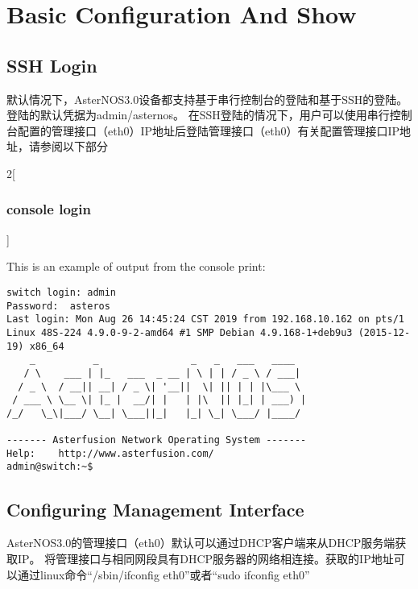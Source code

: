 
\chapter{Basic Configuration And Show}
	\section{SSH Login}
	默认情况下，AsterNOS3.0设备都支持基于串行控制台的登陆和基于SSH的登陆。登陆的默认凭据为admin/asternos。
	在SSH登陆的情况下，用户可以使用串行控制台配置的管理接口（eth0）IP地址后登陆管理接口（eth0）有关配置管理接口IP地址，请参阅以下部分
	
	\begin{paracol}{2}[\subsection*{console login}]
		\begin{rightcolumn}
		This is an example of output from the console print:
			\begin{lstlisting}
switch login: admin                    
Password:  asteros            
Last login: Mon Aug 26 14:45:24 CST 2019 from 192.168.10.162 on pts/1
Linux 48S-224 4.9.0-9-2-amd64 #1 SMP Debian 4.9.168-1+deb9u3 (2015-12-19) x86_64
    _          _                _   _   ___   ____  
   / \    ___ | |_   ___  _ __ | \ | | / _ \ / ___| 
  / _ \  / __|| __| / _ \| '__||  \| || | | |\___ \ 
 / ___ \ \__ \| |_ |  __/| |   | |\  || |_| | ___) |
/_/   \_\|___/ \__| \___||_|   |_| \_| \___/ |____/ 

------- Asterfusion Network Operating System -------
Help:    http://www.asterfusion.com/
admin@switch:~$                                                                   
			\end{lstlisting}
		\end{rightcolumn}
	\end{paracol}
	
	
	\section{Configuring Management Interface}
	AsterNOS3.0的管理接口（eth0）默认可以通过DHCP客户端来从DHCP服务端获取IP。
	将管理接口与相同网段具有DHCP服务器的网络相连接。获取的IP地址可以通过linux命令“/sbin/ifconfig eth0”或者“sudo ifconfig eth0”
	



